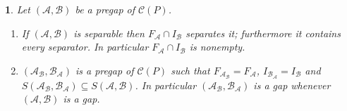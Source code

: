 \documentclass[12pt]{amsart}
\newtheorem{lemma}[definition]{\noindent {\bf Lemma}}
\begin{document}
\begin{lemma}\label{lem:pregaps}
Let $(\mathcal A,  \mathcal B)$ be a pregap of $\mathcal C (P)$. 
\begin{enumerate} [{(i)}] 

\item \label{item i} 
If $(\mathcal A, \mathcal B)$ is separable then $F_{\mathcal A}\cap
I_{\mathcal B}$ separates it; furthermore it contains every separator.
In particular $F_{\mathcal A}\cap I_{\mathcal B}$ is nonempty.
 
\item \label{item ii}
$(\mathcal A_{\mathcal B}, \mathcal B_{\mathcal A})$ is a pregap of
$\mathcal C (P)$ such that $F_{\mathcal A_{\mathcal
B}}=F_{\mathcal A}$, $I_{\mathcal B_{\mathcal A}}= I_{\mathcal B}$ and
$S(\mathcal A_{\mathcal B}, \mathcal B_{\mathcal A})\subseteq
S(\mathcal A,\mathcal B)$. In particular $(\mathcal A_{\mathcal B},
\mathcal B_{\mathcal A})$ is a gap whenever $(\mathcal A, \mathcal B)$
is a gap.
 
\end{enumerate}
\end{lemma}
\end{document}
